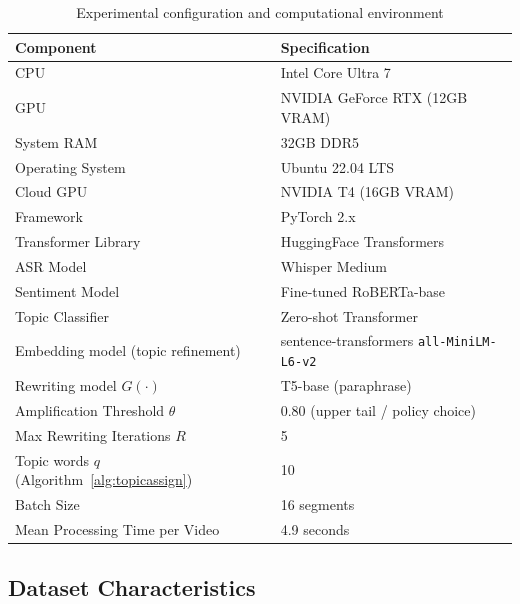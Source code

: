 \documentclass[final,1p,times]{elsarticle}
\begin{document}
\begin{table}[H]
\centering
\caption{Experimental configuration and computational environment}
\label{tab:experiment_full}
\small
\begin{tabular}{p{5cm} p{6cm}}
\hline
Component & Specification \\
\hline
CPU & Intel Core Ultra 7 \\
GPU & NVIDIA GeForce RTX (12GB VRAM) \\
System RAM & 32GB DDR5 \\
Operating System & Ubuntu 22.04 LTS \\
Cloud GPU & NVIDIA T4 (16GB VRAM) \\
Framework & PyTorch 2.x \\
Transformer Library & HuggingFace Transformers \\
ASR Model & Whisper Medium \\
Sentiment Model & Fine-tuned RoBERTa-base \\
Topic Classifier & Zero-shot Transformer \\
Embedding model (topic refinement) & sentence-transformers \texttt{all-MiniLM-L6-v2} \\
Rewriting model $G(\cdot)$ & T5-base (paraphrase) \\
Amplification Threshold $\theta$ & 0.80 (upper tail / policy choice) \\
Max Rewriting Iterations $R$ & 5 \\
Topic words $q$ (Algorithm~\ref{alg:topicassign}) & 10 \\
Batch Size & 16 segments \\
Mean Processing Time per Video & 4.9 seconds \\
\hline
\end{tabular}
\end{table}


\subsection{Dataset Characteristics}
\end{document}

